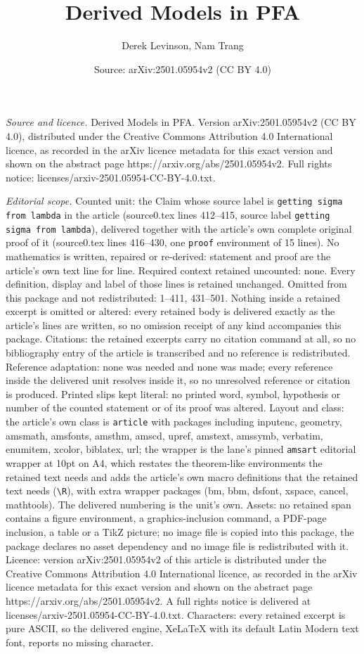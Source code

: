 \documentclass[10pt,a4paper]{amsart}
\title[Derived Models in PFA]{Derived Models in PFA}
\author{Derek Levinson, Nam Trang}
\date{Source: arXiv:2501.05954v2 (CC BY 4.0)}
\begin{document}
\maketitle

\noindent\emph{Source and licence.} Derived Models in PFA. Version arXiv:2501.05954v2 (CC BY 4.0), distributed under the Creative Commons Attribution 4.0 International licence, as recorded in the arXiv licence metadata for this exact version and shown on the abstract page https://arxiv.org/abs/2501.05954v2. Full rights notice: licenses/arxiv-2501.05954-CC-BY-4.0.txt.\par\smallskip

\noindent\textit{Editorial scope.} Counted unit: the Claim whose source label is \texttt{getting sigma from lambda} in the article (source0.tex lines 412--415, source label \texttt{getting sigma from lambda}), delivered together with the article's own complete original proof of it (source0.tex lines 416--430, one \texttt{proof} environment of 15 lines). No mathematics is written, repaired or re-derived: statement and proof are the article's own text line for line. Required context retained uncounted: none. Every definition, display and label of those lines is retained unchanged. Omitted from this package and not redistributed: 1--411, 431--501. Nothing inside a retained excerpt is omitted or altered: every retained body is delivered exactly as the article's lines are written, so no omission receipt of any kind accompanies this package. Citations: the retained excerpts carry no citation command at all, so no bibliography entry of the article is transcribed and no reference is redistributed. Reference adaptation: none was needed and none was made; every reference inside the delivered unit resolves inside it, so no unresolved reference or citation is produced. Printed slips kept literal: no printed word, symbol, hypothesis or number of the counted statement or of its proof was altered. Layout and class: the article's own class is \texttt{article} with packages including inputenc, geometry, amsmath, amsfonts, amsthm, amscd, upref, amstext, amssymb, verbatim, enumitem, xcolor, biblatex, url; the wrapper is the lane's pinned \texttt{amsart} editorial wrapper at 10pt on A4, which restates the theorem-like environments the retained text needs and adds the article's own macro definitions that the retained text needs (\texttt{\textbackslash R}), with extra wrapper packages (bm, bbm, dsfont, xspace, cancel, mathtools). The delivered numbering is the unit's own. Assets: no retained span contains a figure environment, a graphics-inclusion command, a PDF-page inclusion, a table or a TikZ picture; no image file is copied into this package, the package declares no asset dependency and no image file is redistributed with it. Licence: version arXiv:2501.05954v2 of this article is distributed under the Creative Commons Attribution 4.0 International licence, as recorded in the arXiv licence metadata for this exact version and shown on the abstract page https://arxiv.org/abs/2501.05954v2. A full rights notice is delivered at licenses/arxiv-2501.05954-CC-BY-4.0.txt. Characters: every retained excerpt is pure ASCII, so the delivered engine, XeLaTeX with its default Latin Modern text font, reports no missing character.
\end{document}
